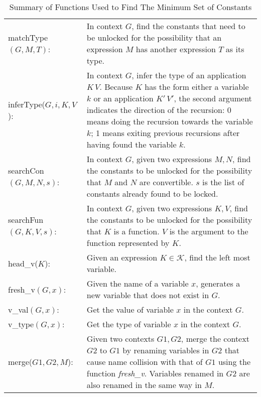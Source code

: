 \begin{table}[h] 
  \centering
  \begin{tabular}{l p{10cm}}
    matchType$(G, M, T)$: & In context $G$, find the constants that need to be unlocked for the possibility that an expression $M$ has another expression $T$ as its  type. \\
    inferType($G, i, K, V$): & In context $G$, infer the type of an application $K\,V$. Because $K$ has the form either a variable $k$ or an application $K'\,V'$, the second argument indicates the direction of the recursion: 0 means doing the recursion towards the variable $k$; 1 means exiting previous recursions after having found the variable $k$. \\
    searchCon$(G, M, N, s)$: & In context $G$, given two expressions $M,N$, find the constants to be unlocked for the possibility that $M$ and $N$ are convertible. $s$ is the list of constants already found to be locked. \\
    searchFun$(G, K, V, s)$: & In context $G$, given two expressions $K,V$, find the constants to be unlocked for the possibility that $K$ is a function. $V$ is the argument to the function represented by $K$. \\
    head\_v($K$):&  Given an expression $K \in \mathcal{K}$, find the left most variable. \\
    fresh\_v$(G, x)$: & Given the name of a variable $x$, generates a new variable that does not exist in $G$. \\
    v\_val$(G, x)$:& Get the value of variable $x$ in the context $G$. \\
    v\_type$(G, x)$:& Get the type of variable $x$ in the context $G$. \\
    merge($G1, G2, M$): & Given two contexts $G1,G2$, merge the context $G2$ to $G1$ by renaming variables in $G2$ that cause name collision with that of $G1$ using the function \emph{fresh\_v}. Variables renamed in $G2$ are also renamed in the same way in $M$.
  \end{tabular}
  \caption{Summary of Functions Used to Find The Minimum Set of Constants}
  \label{theory:tab:summary}
\end{table}

